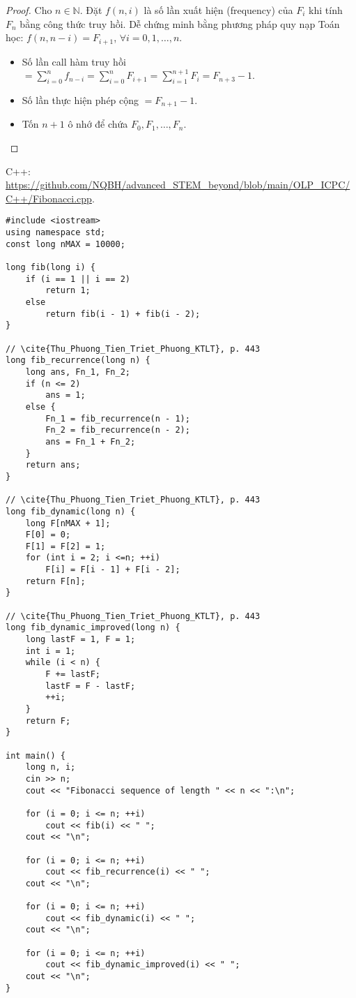 \documentclass{article}
\begin{document}
\begin{proof}
	Cho $n\in\mathbb{N}$. Đặt $f(n,i)$ là số lần xuất hiện (frequency) của $F_i$ khi tính $F_n$ bằng công thức truy hồi. Dễ chứng minh bằng phương pháp quy nạp Toán học: $f(n,n - i) = F_{i + 1}$, $\forall i = 0,1,\ldots,n$.
	\begin{itemize}
		\item Số lần call hàm truy hồi $= \sum_{i=0}^n f_{n-i} = \sum_{i=0}^n F_{i+1} = \sum_{i=1}^{n+1} F_i = F_{n+3} - 1$.
		\item Số lần thực hiện phép cộng $= F_{n+1} - 1$.
		\item Tốn $n + 1$ ô nhớ để chứa $F_0,F_1,\ldots,F_n$.
	\end{itemize}
\end{proof}
C++: \url{https://github.com/NQBH/advanced_STEM_beyond/blob/main/OLP_ICPC/C++/Fibonacci.cpp}.
\begin{verbatim}
#include <iostream>
using namespace std;
const long nMAX = 10000;

long fib(long i) {
    if (i == 1 || i == 2)
        return 1;
    else
        return fib(i - 1) + fib(i - 2);
}

// \cite{Thu_Phuong_Tien_Triet_Phuong_KTLT}, p. 443
long fib_recurrence(long n) {
    long ans, Fn_1, Fn_2;
    if (n <= 2)
        ans = 1;
    else {
        Fn_1 = fib_recurrence(n - 1);
        Fn_2 = fib_recurrence(n - 2);
        ans = Fn_1 + Fn_2;
    }
    return ans;
}

// \cite{Thu_Phuong_Tien_Triet_Phuong_KTLT}, p. 443
long fib_dynamic(long n) {
    long F[nMAX + 1];
    F[0] = 0;
    F[1] = F[2] = 1;
    for (int i = 2; i <=n; ++i)
        F[i] = F[i - 1] + F[i - 2];
    return F[n];
}

// \cite{Thu_Phuong_Tien_Triet_Phuong_KTLT}, p. 443
long fib_dynamic_improved(long n) {
    long lastF = 1, F = 1;
    int i = 1;
    while (i < n) {
        F += lastF;
        lastF = F - lastF;
        ++i;
    }
    return F;
}

int main() {
    long n, i;
    cin >> n;
    cout << "Fibonacci sequence of length " << n << ":\n";
	
    for (i = 0; i <= n; ++i)
        cout << fib(i) << " ";
    cout << "\n";
	
    for (i = 0; i <= n; ++i)
        cout << fib_recurrence(i) << " ";
    cout << "\n";
	
    for (i = 0; i <= n; ++i)
        cout << fib_dynamic(i) << " ";
    cout << "\n";
	
    for (i = 0; i <= n; ++i)
        cout << fib_dynamic_improved(i) << " ";
    cout << "\n";
}
\end{verbatim}
\end{document}
